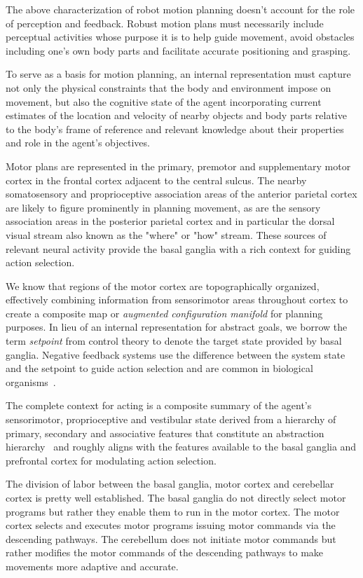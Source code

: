 \documentclass[letterpaper,11pt]{article}
\begin{document}
The above characterization of robot motion planning doesn't account for the role of perception and feedback. Robust motion plans must necessarily include perceptual activities whose purpose it is to help guide movement, avoid obstacles including one's own body parts and facilitate accurate positioning and grasping.      

To serve as a basis for motion planning, an internal representation must capture not only the physical constraints that the body and environment impose on movement, but also the cognitive state of the agent incorporating current estimates of the location and velocity of nearby objects and body parts relative to the body's frame of reference and relevant knowledge about their properties and role in the agent's objectives.

Motor plans are represented in the primary, premotor and supplementary motor cortex in the frontal cortex adjacent to the central sulcus. The nearby somatosensory and proprioceptive association areas of the anterior parietal cortex are likely to figure prominently in planning movement, as are the sensory association areas in the posterior parietal cortex and in particular the dorsal visual stream also known as the "where" or "how" stream. These sources of relevant neural activity provide the basal ganglia with a rich context for guiding action selection.

We know that regions of the motor cortex are topographically organized, effectively combining information from sensorimotor areas throughout cortex to create a composite map or {\it{augmented configuration manifold}} for planning purposes. In lieu of an internal representation for abstract goals, we borrow the term {\it{setpoint}} from control theory to denote the target state provided by basal ganglia. Negative feedback systems use the difference between the system state and the setpoint to guide action selection and are common in biological organisms~\cite{Ashby1957cybernetics}.

The complete context for acting is a composite summary of the agent's sensorimotor, proprioceptive and vestibular state derived from a hierarchy of primary, secondary and associative features that constitute an abstraction hierarchy~\cite{FusterPREFRONTAL-CORTEX-15-CHAPTER_8} and roughly aligns with the features available to the basal ganglia and prefrontal cortex for modulating action selection.

The division of labor between the basal ganglia, motor cortex and cerebellar cortex is pretty well established. The basal ganglia do not directly select motor programs but rather they enable them to run in the motor cortex. The motor cortex selects and executes motor programs issuing motor commands via the descending pathways. The cerebellum does not initiate motor commands but rather modifies the motor commands of the descending pathways to make movements more adaptive and accurate. 
\end{document}
